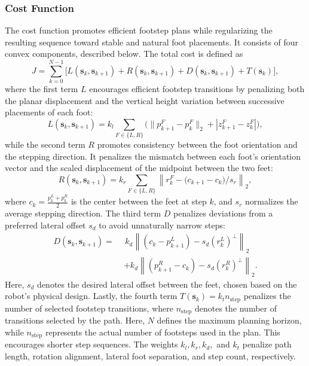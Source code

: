 \documentclass[letterpaper, 10 pt, journal, twoside]{IEEEtran}
\begin{document}
\subsubsection{Cost Function}
The cost function promotes efficient footstep plans while regularizing the resulting sequence toward stable and natural foot placements.
It consists of four convex components, described below.
The total cost is defined as
\begin{equation}
J=\sum_{k=0}^{N-1}\!\bigl[
L(\mathbf{s}_k,\mathbf{s}_{k+1})+R(\mathbf{s}_k,\mathbf{s}_{k+1})
+D(\mathbf{s}_k,\mathbf{s}_{k+1})+T(\mathbf{s}_k)
\bigr],
\label{eq:total_cost}
\end{equation}
\noindent where the first term \(L\) encourages efficient footstep transitions by penalizing both the planar displacement and the vertical height variation between successive placements of each foot:
\begin{equation}
L(\mathbf{s}_k,\mathbf{s}_{k+1})
= k_l\sum_{F\in\{L,R\}}
\bigl(\|p_{k+1}^F-p_k^F\|_2+|z_{k+1}^F-z_k^F|\bigr),
\end{equation}
\noindent
while the second term \(R\) promotes consistency between the foot orientation and the stepping direction.
It penalizes the mismatch between each foot's orientation vector and the scaled displacement of the midpoint between the two feet:
\begin{equation}
    R(\mathbf{s}_k, \mathbf{s}_{k+1})
    = k_r \sum_{F \in \{L,R\}} \left\| r_k^F - \bigl(c_{k+1} - c_k\bigr)/s_r \right\|_2,
\label{eq:rotation_cost}
\end{equation}
\noindent where \(c_k = \frac{p_k^L + p_k^R}{2}\) is the center between the feet at step \(k\), and \(s_r\) normalizes the average stepping direction.
The third term \(D\) penalizes deviations from a preferred lateral offset \(s_d\) to avoid unnaturally narrow steps:
\begin{equation}
\begin{aligned}
D(\mathbf{s}_k, \mathbf{s}_{k+1}) =\;
&\, k_d \left\| \left(c_k - p_{k+1}^L\right) - s_d (r_k^L)^\perp \right\|_2 \\
&+ k_d \left\| \left(p_{k+1}^R - c_k\right) - s_d (r_k^R)^\perp \right\|_2 .
\end{aligned}
\label{eq:model_cost}
\end{equation}
Here, \(s_d\) denotes the desired lateral offset between the feet, chosen based on the robot's physical design.
Lastly, the fourth term \(T(\mathbf{s}_k)=k_t n_{\mathrm{step}}\) penalizes the number of selected footstep transitions, where \(n_{\mathrm{step}}\) denotes the number of transitions selected by the path.
Here, \(N\) defines the maximum planning horizon, while \(n_{\mathrm{step}}\) represents the actual number of footsteps used in the plan.
This encourages shorter step sequences.
The weights \(k_l, k_r, k_d,\) and \(k_t\) penalize path length, rotation alignment, lateral foot separation, and step count, respectively.
\end{document}
